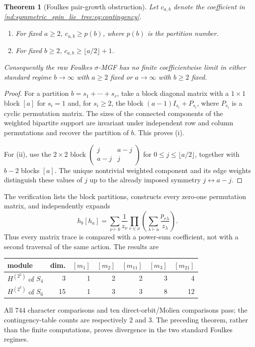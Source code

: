 \documentclass[10pt]{article}
\newtheorem{theorem}{Theorem}
\begin{document}
\begin{theorem}[Foulkes pair-growth obstruction]
Let $c_{a,b}$ denote the coefficient in
\eqref{nd:symmetric_spin_lie_tree:eq:contingency}.
\begin{enumerate}[label=(\roman*)]
\item For fixed $a\ge2$, $c_{a,b}\ge p(b)$, where $p(b)$ is the partition
number.
\item For fixed $b\ge2$, $c_{a,b}\ge\lfloor a/2\rfloor+1$.
\end{enumerate}
Consequently the raw Foulkes $\sigma$-MGF has no finite coefficientwise limit
in either standard regime $b\to\infty$ with $a\ge2$ fixed or
$a\to\infty$ with $b\ge2$ fixed.
\end{theorem}
\begin{proof}
For a partition $b=s_1+\cdots+s_r$, take a block diagonal matrix with a
$1\times1$ block $[a]$ for $s_i=1$ and, for $s_i\ge2$, the block
$(a-1)I_{s_i}+P_{s_i}$, where $P_{s_i}$ is a cyclic permutation matrix. The
sizes of the connected components of the weighted bipartite support are
invariant under independent row and column permutations and recover the
partition of $b$. This proves (i).

For (ii), use the $2\times2$ block
$\left(\begin{smallmatrix}j&a-j\\a-j&j\end{smallmatrix}\right)$ for
$0\le j\le\lfloor a/2\rfloor$, together with $b-2$ blocks $[a]$. The unique
nontrivial weighted component and its edge weights distinguish these values
of $j$ up to the already imposed symmetry $j\leftrightarrow a-j$.
\end{proof}

The verification lists the block partitions, constructs every zero-one
permutation matrix, and independently expands
\[
 h_b[h_a]=\sum_{\nu\vdash b}\frac1{z_\nu}
 \prod_{r\in\nu}\left(\sum_{\lambda\vdash a}
 \frac{p_{r\lambda}}{z_\lambda}\right).
\]
Thus every matrix trace is compared with a power-sum coefficient, not with a
second traversal of the same action.  The results are
\begin{center}
\begin{tabular}{@{}lrrrrrr@{}}\toprule
module&dim.&$[m_1]$&$[m_2]$&$[m_{11}]$&$[m_3]$&$[m_{21}]$\\\midrule
$H^{(2^2)}$ of $S_4$&3&1&2&2&3&4\\
$H^{(2^3)}$ of $S_6$&15&1&3&3&8&12\\\bottomrule
\end{tabular}
\end{center}
All $744$ character comparisons and ten direct-orbit/Molien comparisons pass;
the contingency-table counts are respectively $2$ and $3$. The preceding
theorem, rather than the finite computations, proves divergence in the two
standard Foulkes regimes.
\end{document}
